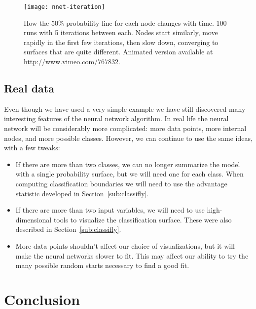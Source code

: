 \documentclass[preprint]{imsart}
\begin{document}
\begin{figure}[htbp]
  \centering
    \texttt{[image: nnet-iteration]}
  \caption{How the 50\% probability line for each node changes with time.  100 runs with 5 iterations between each.  Nodes start similarly, move rapidly in the first few iterations, then slow down, converging to surfaces that are quite different.  Animated version available at \url{http://www.vimeo.com/767832}.}
  \label{fig:nnet-iteration}
\end{figure}

\subsection{Real data}

Even though we have used a very simple example we have still discovered many interesting features of the neural network algorithm.  In real life the neural network will be considerably more complicated: more data points, more internal nodes, and more possible classes.  However, we can continue to use the same ideas, with a few tweaks:

\begin{itemize} \itemsep 0in
  \item If there are more than two classes, we can no longer summarize the model with a single probability surface, but we will need one for each class.  When computing classification boundaries we will need to use the advantage statistic developed in Section~\ref{sub:classifly}.

  \item If there are more than two input variables, we will need to use high-dimensional tools to visualize the classification surface.  These were also described in Section~\ref{sub:classifly}.

  \item More data points shouldn't affect our choice of visualizations, but it will make the neural networks slower to fit.  This may affect our ability to try the many possible random starts necessary to find a good fit.

\end{itemize}

\section{Conclusion}
\label{sec:conclusion}
\end{document}
